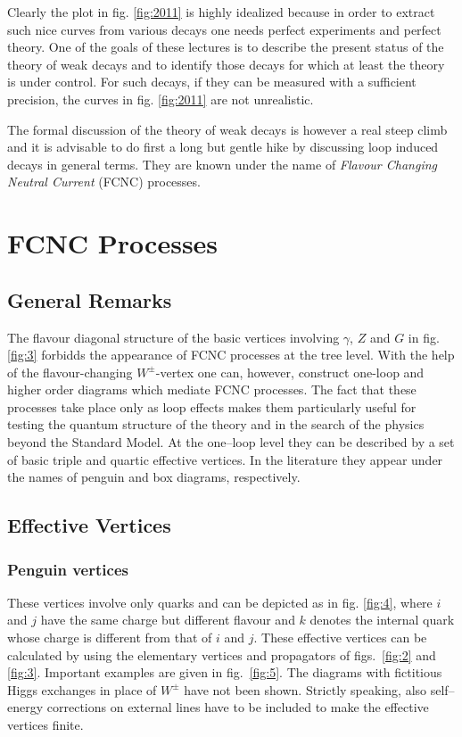 \documentclass[12pt]{article}
\begin{document}
\begin{itemize}
Clearly the plot in fig. \ref{fig:2011} is highly idealized because in order
to extract such nice curves from various decays one needs perfect
experiments and perfect theory. 
One of the goals of these lectures is to describe the present status
of the theory of weak decays and to identify those decays
for which at least the theory is under control. For such decays,
if they can be measured with a sufficient precision, the curves
in fig. \ref{fig:2011} are  not unrealistic.

The formal discussion of the theory of weak decays is however a real
steep climb and it is advisable to do first a long but gentle hike
by discussing loop induced decays in general terms.
They are known under the name of
{\it Flavour Changing Neutral Current} (FCNC) processes.

\section{FCNC Processes}
\setcounter{equation}{0}
\subsection{General Remarks}
The flavour diagonal structure of the basic vertices involving $\gamma$,
$Z$ and $G$ in fig. \ref{fig:3} 
forbidds the appearance of FCNC processes at the
tree level. With the help of the flavour-changing $W^\pm$-vertex one
can, however, construct one-loop and higher order diagrams which mediate
FCNC processes. The fact that these processes take place only as loop
effects makes them particularly useful for testing the quantum structure
of the theory and in the search of the physics beyond the Standard Model.
At the one--loop level
they can be described by a set
of basic triple and quartic effective vertices. In the literature they
appear under the names of penguin and box diagrams, respectively.
\subsection{Effective Vertices}
\subsubsection{Penguin vertices}
\noindent
These vertices involve only quarks and can be depicted as in 
fig. \ref{fig:4},
where $i$ and $j$ have the same charge but different flavour and $k$
denotes the internal quark whose charge is different from that of $i$
and $j$. 
These effective vertices 
can be calculated by using the elementary vertices and 
propagators of figs.~\ref{fig:2} and \ref{fig:3}.
Important examples are given in fig.~\ref{fig:5}.
The diagrams with fictitious Higgs exchanges in place of $W^\pm$ have 
not been
shown. Strictly
speaking, also self--energy corrections on external lines have to be
included to make the effective vertices finite.

\end{itemize}
\end{document}
